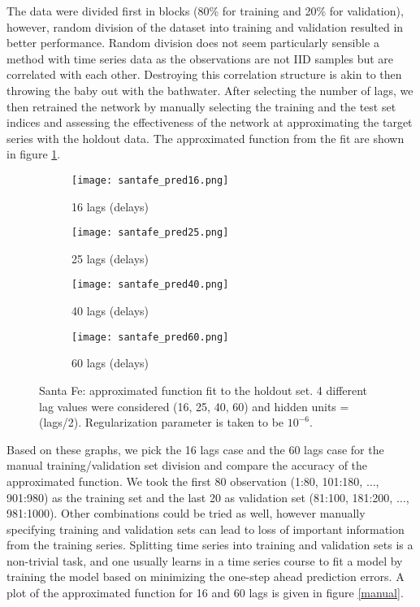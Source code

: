 \documentclass[paper=a4, fontsize=11pt]{scrartcl} %
\numberwithin{equation}{section} %
\begin{document}
The data were divided first in blocks (80\% for training and 20\% for validation), however, random division of the dataset into training and validation resulted in better performance. Random division does not seem particularly sensible a method with time series data as the observations are not IID samples but are correlated with each other. Destroying this correlation structure is akin to then throwing the baby out with the bathwater. After selecting the number of lags, we then retrained the network by manually selecting the training and the test set indices and assessing the effectiveness of the network at approximating the target series with the holdout data. The approximated function from the fit are shown in figure \ref{lag}.\\

\begin{figure}[ht]
	\begin{subfigure}[b]{0.5\textwidth}
		\centering
		\texttt{[image: santafe\_pred16.png]}
		\caption{16 lags (delays)}
	\end{subfigure}
	\begin{subfigure}[b]{0.5\textwidth}
		\centering
		\texttt{[image: santafe\_pred25.png]}
		\caption{25 lags (delays)}
	\end{subfigure}
	
	\begin{subfigure}[b]{0.5\textwidth}
		\centering
		\texttt{[image: santafe\_pred40.png]}
		\caption{40 lags (delays)}
	\end{subfigure}
	\begin{subfigure}[b]{0.5\textwidth}
		\centering
		\texttt{[image: santafe\_pred60.png]}
		\caption{60 lags (delays)}
	\end{subfigure}
\caption{Santa Fe: approximated function fit to the holdout set. 4 different lag values were considered (16, 25, 40, 60) and hidden units = (lags/2). Regularization parameter is taken to be $10^{-6}$.}
\label{lag}
\end{figure}

Based on these graphs, we pick the 16 lags case and the 60 lags case for the manual training/validation set division and compare the accuracy of the approximated function. We took the first 80 observation (1:80, 101:180, $\ldots$, 901:980) as the training set and the last 20 as validation set (81:100, 181:200, $\ldots$, 981:1000). Other combinations could be tried as well, however manually specifying training and validation sets can lead to loss of important information from the training series. Splitting time series into training and validation sets is a non-trivial task, and one usually learns in a time series course to fit a model by training the model based on minimizing the one-step ahead prediction errors. A plot of the approximated function for 16 and 60 lags is given in figure \ref{manual}.
\end{document}
